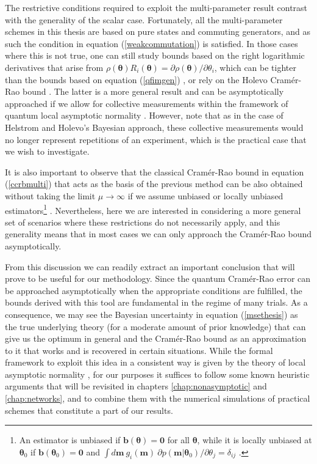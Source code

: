 The restrictive conditions required to exploit the multi-parameter result contrast with the generality of the scalar case. Fortunately, all the multi-parameter schemes in this thesis are based on pure states and commuting generators, and as such the condition in equation (\ref{weakcommutation}) is satisfied. In those cases where this is not true, one can still study bounds based on the right logarithmic derivatives that arise from $\rho(\boldsymbol{\theta})R_i(\boldsymbol{\theta}) = \partial \rho(\boldsymbol{\theta})/\partial \theta_i$, which can be tighter than the bounds based on equation (\ref{qfimgen}) \cite{Szczykulska2016, helstrom1976}, or rely on the Holevo Cram\'{e}r-Rao bound \cite{holevo2011, sammy2016compatibility, albarelli2019}. The latter is a more general result and can be asymptotically approached if we allow for collective measurements within the framework of quantum local asymptotic normality \cite{sammy2016compatibility, gill2011}. However, note that as in the case of Helstrom and Holevo's Bayesian approach, these collective measurements would no longer represent repetitions of an experiment, which is the practical case that we wish to investigate. 

It is also important to observe that the classical Cram\'{e}r-Rao bound in equation (\ref{ccrbmulti}) that acts as the basis of the previous method can be also obtained without taking the limit $\mu \rightarrow \infty$ if we assume unbiased or locally unbiased estimators\footnote{An estimator is unbiased if $\boldsymbol{b}(\boldsymbol{\theta}) = \boldsymbol{0}$ for all $\boldsymbol{\theta}$, while it is locally unbiased at $\boldsymbol{\theta}_0$ if $\boldsymbol{b}(\boldsymbol{\theta}_0) = \boldsymbol{0}$ and $\int d\boldsymbol{m} ~ g_i(\boldsymbol{m})~ \partial p(\boldsymbol{m}|\boldsymbol{\theta}_0)/\partial \theta_j = \delta_{ij}$ \cite{fraser1964}.} \cite{kay1993, rafal2015, kolodynski2014, hall2012}. Nevertheless, here we are interested in considering a more general set of scenarios where these restrictions do not necessarily apply, and this generality means that in most cases we can only approach the Cram\'{e}r-Rao bound asymptotically.

From this discussion we can readily extract an important conclusion that will prove to be useful for our methodology. Since the quantum Cram\'{e}r-Rao error can be approached asymptotically when the appropriate conditions are fulfilled, the bounds derived with this tool are fundamental in the regime of many trials. As a consequence, we may see the Bayesian uncertainty in equation (\ref{msethesis}) as the true underlying theory (for a moderate amount of prior knowledge) that can give us the optimum in general and the Cram\'{e}r-Rao bound as an approximation to it that works and is recovered in certain situations. While the formal framework to exploit this idea in a consistent way is given by the theory of local asymptotic normality \cite{lecam1986, vaart1998, gill2011}, for our purposes it suffices to follow some known heuristic arguments that will be revisited in chapters \ref{chap:nonasymptotic} and \ref{chap:networks}, and to combine them with the numerical simulations of practical schemes that constitute a part of our results. 

